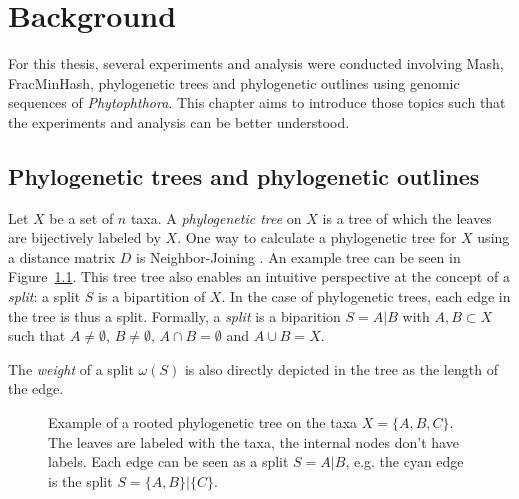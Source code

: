
\chapter{Background}
  \label{sec:background}

For this thesis, several experiments and analysis were conducted involving Mash,
FracMinHash, phylogenetic trees and phylogenetic outlines using genomic
sequences of \textit{Phytophthora}. This chapter aims to introduce those topics
such that the experiments and analysis can be better understood.

\section{Phylogenetic trees and phylogenetic outlines}
Let $X$ be a set of $n$ taxa. A \textit{phylogenetic tree} on $X$ is a tree of
which the leaves are bijectively labeled by $X$. One way to calculate a
phylogenetic tree for $X$ using a distance matrix $D$ is Neighbor-Joining
\cite{saitouNeighborjoiningMethodNew1987}. An example tree can be seen in
Figure~\ref{fig:exampleTree}. This tree tree also enables an intuitive
perspective at the concept of a \textit{split}: a split $S$ is a bipartition of
$X$. In the case of phylogenetic trees, each edge in the tree is thus a split.
Formally, a \textit{split} is a biparition $S=A|B$ with $A, B \subset X$
such that $A \neq \emptyset$, $B \neq \emptyset$, $A \cap B = \emptyset$ and $A
\cup B = X$.  

The \textit{weight} of a split $\omega(S)$ is also directly depicted in the tree
as the length of the edge. 

\begin{figure}
  \centering
  \caption{Example of a rooted phylogenetic tree on the taxa $X = \{A, B, C\}$.
  The leaves are labeled with the taxa, the internal nodes don't have labels.
  Each edge can be seen as a split $S=A|B$, e.g. the cyan edge is the split $S =
  \{A, B\} | \{C\}$.}
  \label{fig:exampleTree}
\end{figure}

